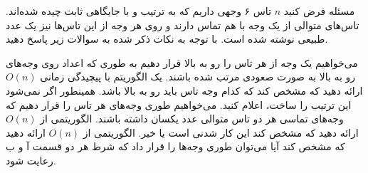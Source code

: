 ‌مسئله
فرض کنید $n$ تاس ۶ وجهی داریم که به ترتیب و با جایگاهی ثابت چیده شده‌اند. تاس‌های متوالی از یک وجه با هم تماس دارند و روی هر وجه از این تاس‌ها نیز یک عدد طبیعی نوشته شده است. با توجه به نکات ذکر شده به سوالات زیر پاسخ دهید.






می‌خواهیم یک وجه از هر تاس را رو به بالا قرار دهیم به طوری که اعداد روی وجه‌های رو به بالا به صورت صعودی مرتب شده باشند. یک الگوریتم با پیچیدگی زمانی $O(n)$ ارائه دهید که مشخص کند که کدام وجه تاس باید رو به بالا باشد. همینطور اگر نمی‌شود این ترتیب را ساخت، اعلام کنید.
می‌خواهیم طوری وجه‌های هر تاس را قرار دهیم که وجه‌های تماسی هر دو تاس متوالی عدد یکسان داشته باشند. الگوریتمی از $O(n)$ ارائه دهید که مشخص کند این کار شدنی است یا خیر.
الگوریتمی از $O(n)$  ارائه دهید که مشخص کند آیا می‌توان طوری وجه‌ها را قرار داد که شرط هر دو قسمت آ و ب رعایت شود.











